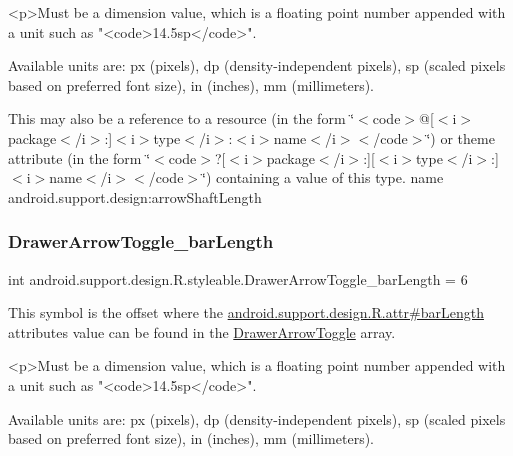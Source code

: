 \begin{DoxyVerb}      <p>Must be a dimension value, which is a floating point number appended with a unit such as "<code>14.5sp</code>".
\end{DoxyVerb}
 Available units are\+: px (pixels), dp (density-\/independent pixels), sp (scaled pixels based on preferred font size), in (inches), mm (millimeters). 

This may also be a reference to a resource (in the form \char`\"{}$<$code$>$@\mbox{[}$<$i$>$package$<$/i$>$\+:\mbox{]}$<$i$>$type$<$/i$>$\+:$<$i$>$name$<$/i$>$$<$/code$>$\char`\"{}) or theme attribute (in the form \char`\"{}$<$code$>$?\mbox{[}$<$i$>$package$<$/i$>$\+:\mbox{]}\mbox{[}$<$i$>$type$<$/i$>$\+:\mbox{]}$<$i$>$name$<$/i$>$$<$/code$>$\char`\"{}) containing a value of this type.  name android.\+support.\+design\+:arrow\+Shaft\+Length \mbox{\label{classandroid_1_1support_1_1design_1_1R_1_1styleable_ae52627e17694eb02d691f0e5d355fb74}} 
\subsubsection{\texorpdfstring{Drawer\+Arrow\+Toggle\+\_\+bar\+Length}{DrawerArrowToggle\_barLength}}
{\footnotesize\ttfamily int android.\+support.\+design.\+R.\+styleable.\+Drawer\+Arrow\+Toggle\+\_\+bar\+Length = 6\hspace{0.3cm}{\ttfamily [static]}}

This symbol is the offset where the \hyperlink{classandroid_1_1support_1_1design_1_1R_1_1attr_a38fc388c8d6cd00ce22d642ef15bb9b2}{android.\+support.\+design.\+R.\+attr\#bar\+Length} attribute\textquotesingle{}s value can be found in the \hyperlink{classandroid_1_1support_1_1design_1_1R_1_1styleable_a559d22c78738e5161420dc4b41689c1b}{Drawer\+Arrow\+Toggle} array.

\begin{DoxyVerb}      <p>Must be a dimension value, which is a floating point number appended with a unit such as "<code>14.5sp</code>".
\end{DoxyVerb}
 Available units are\+: px (pixels), dp (density-\/independent pixels), sp (scaled pixels based on preferred font size), in (inches), mm (millimeters). 

